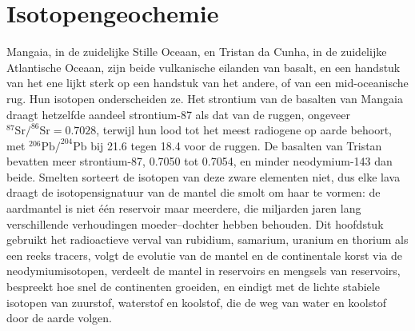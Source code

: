 \chapter{Isotopengeochemie}\label{ch:b2:isotope-geochemistry}

Mangaia, in de zuidelijke Stille Oceaan, en Tristan da Cunha, in de zuidelijke
Atlantische Oceaan, zijn beide vulkanische eilanden van basalt, en een handstuk van
het ene lijkt sterk op een handstuk van het andere, of van een mid-oceanische rug.
Hun isotopen onderscheiden ze. Het strontium van de basalten van Mangaia draagt
hetzelfde aandeel strontium-87 als dat van de ruggen, ongeveer
$^{87}\mathrm{Sr}/^{86}\mathrm{Sr} = 0.7028$, terwijl hun lood tot het meest
radiogene op aarde behoort, met $^{206}\mathrm{Pb}/^{204}\mathrm{Pb}$ bij 21.6 tegen
18.4 voor de ruggen. De basalten van Tristan bevatten meer strontium-87, 0.7050 tot
0.7054, en minder neodymium-143 dan beide. Smelten sorteert de isotopen van
deze zware elementen niet, dus elke lava draagt de isotopensignatuur van de
mantel die smolt om haar te vormen: de aardmantel is niet één reservoir maar
meerdere, die miljarden jaren lang verschillende verhoudingen moeder--dochter hebben
behouden. Dit hoofdstuk gebruikt het radioactieve verval van rubidium, samarium, uranium
en thorium als een reeks tracers, volgt de evolutie van de mantel en de
continentale korst via de neodymiumisotopen, verdeelt de mantel in
reservoirs en mengsels van reservoirs, bespreekt hoe snel de continenten groeiden,
en eindigt met de lichte stabiele isotopen van zuurstof, waterstof en koolstof, die
de weg van water en koolstof door de aarde volgen.

